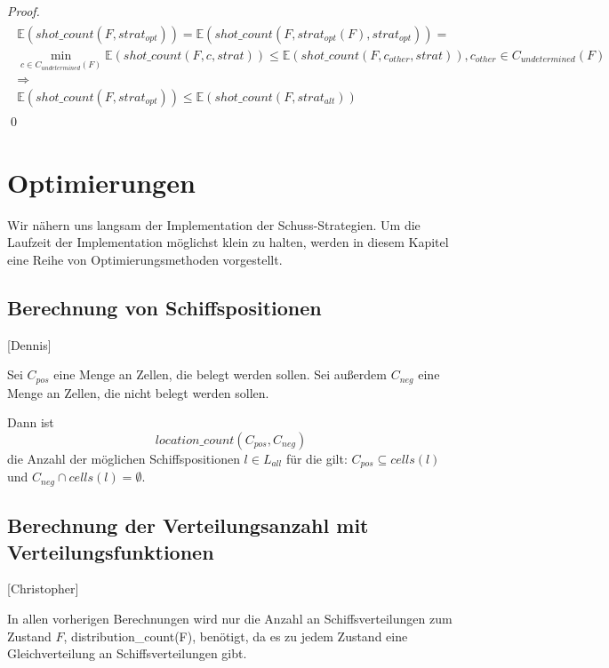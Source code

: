 \documentclass[a4paper,12pt]{llncs}
\numberwithin{equation}{section}
\begin{document}
\begin{proof}
\begin{align}
\begin{split}
\mathds{E}(shot\_count(F, strat_{opt})) =\mathds{E}(shot\_count(F, strat_{opt}(F), strat_{opt}))=\\
\min_{c \in C_{undetermined}(F)} \mathds{E}(shot\_count(F, c, strat)) \leq \mathds{E}(shot\_count(F, c_{other}, strat)), c_{other} \in C_{undetermined}(F)\\
\Rightarrow\\
\mathds{E}(shot\_count(F, strat_{opt})) \leq \mathds{E}(shot\_count(F, strat_{alt}))
\end{split}
\end{align}
\qed
\end{proof}

\newpage

\section{Optimierungen}

Wir nähern uns langsam der Implementation der Schuss-Strategien.
Um die Laufzeit der Implementation möglichst klein zu halten, werden in diesem Kapitel eine Reihe von Optimierungsmethoden vorgestellt.

\subsection{Berechnung von Schiffspositionen}[Dennis]
\begin{definition}
Sei $C_{pos}$ eine Menge an Zellen, die belegt werden sollen. Sei außerdem $C_{neg}$ eine Menge an Zellen, die nicht belegt werden sollen.

Dann ist
\[
location\_count(C_{pos}, C_{neg})
\]
die Anzahl der möglichen Schiffspositionen $l \in L_{all}$ für die gilt: $C_{pos} \subseteq cells(l)$ und $C_{neg} \cap cells(l) = \emptyset$.
\end{definition}

\subsection{Berechnung der Verteilungsanzahl mit Verteilungsfunktionen}[Christopher]

In allen vorherigen Berechnungen wird nur die Anzahl an Schiffsverteilungen zum Zustand $F$, distribution\_count(F), benötigt, da es zu jedem Zustand eine Gleichverteilung an Schiffsverteilungen gibt.
\end{document}
